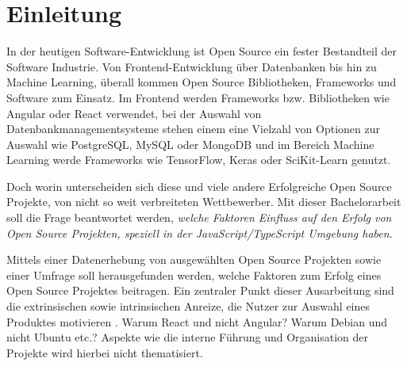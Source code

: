 \chapter{Einleitung}






In der heutigen Software-Entwicklung ist Open Source ein fester Bestandteil der Software Industrie.
Von Frontend-Entwicklung über Datenbanken bis hin zu Machine Learning, überall kommen Open Source
Bibliotheken, Frameworks und Software zum Einsatz.
Im Frontend werden Frameworks bzw. Bibliotheken wie Angular oder React verwendet,
bei der Auswahl von Datenbankmanagementsysteme stehen einem eine Vielzahl von Optionen zur Auswahl
wie PostgreSQL, MySQL oder MongoDB
und im Bereich Machine Learning werde Frameworks wie TensorFlow, Keras oder SciKit-Learn genutzt.

Doch worin unterscheiden sich diese und viele andere Erfolgreiche Open Source Projekte, von nicht
so weit verbreiteten Wettbewerber.
Mit dieser Bachelorarbeit soll die Frage beantwortet werden, \textit{welche Faktoren Einfluss auf
den Erfolg von Open Source Projekten, speziell in der JavaScript/TypeScript Umgebung haben.}


Mittels einer Datenerhebung von ausgewählten Open Source Projekten sowie einer
Umfrage soll herausgefunden werden, welche Faktoren zum Erfolg eines Open Source Projektes beitragen.
Ein zentraler Punkt dieser Ausarbeitung sind die extrinsischen sowie intrinsischen Anreize,
die Nutzer zur Auswahl eines Produktes motivieren \cite{midhaFactorsAffectingSuccess2012}. %
Warum React und nicht Angular? Warum Debian und nicht Ubuntu etc.?
Aspekte wie die interne Führung und Organisation der Projekte wird hierbei nicht thematisiert.




